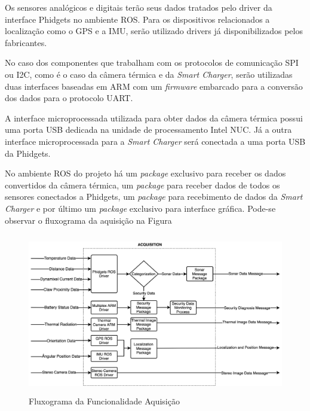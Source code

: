 Os sensores analógicos e digitais terão seus dados tratados pelo driver da interface Phidgets no ambiente ROS. Para os dispositivos relacionados a localização como o GPS e a IMU, serão utilizado drivers já disponibilizados pelos fabricantes.

No caso dos componentes que trabalham com os protocolos de comunicação SPI ou I2C, como é o caso da câmera térmica e da \textit{Smart Charger}, serão utilizadas duas interfaces baseadas em ARM com um \textit{firmware} embarcado para a conversão dos dados para o protocolo UART.

A interface microprocessada utilizada para obter dados da câmera térmica possui uma porta USB dedicada na unidade de processamento Intel NUC. Já a outra interface microprocessada para a \textit{Smart Charger} será conectada a uma porta USB da Phidgets.

No ambiente ROS do projeto há um \textit{package} exclusivo para receber os dados convertidos da câmera térmica, um \textit{package} para receber dados de todos os sensores conectados a Phidgets, um \textit{package} para recebimento de dados da \textit{Smart Charger} e por último um \textit{package} exclusivo para interface gráfica. 
Pode-se observar o fluxograma da aquisição na Figura %

\begin{figure}[!ht]
	\centering
	\includegraphics[height=7cm, width=14cm]{Figures/Fluxograma_Aquisition.jpg}
	\caption{Fluxograma da Funcionalidade Aquisição} \label{FuncAquisition}
\end{figure}

